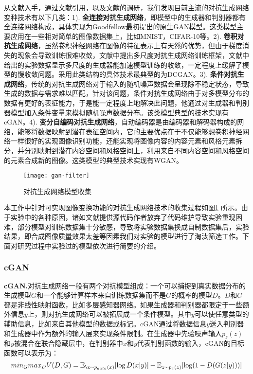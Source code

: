 从文献\cite{UNIT}入手，通过文献引用，以及文献\cite{gan-survey}的调研，我们发现目前主流的对抗生成网络变种技术有以下几类：1). \textbf{全连接对抗生成网络}，即模型中的生成器和判别器都有全连接网络构成，具体实现为Goodfellow最初提出的原生GAN模型。这类模型主要应用在一些相对简单的图像数据集上，比如MNIST，CIFAR-10等。2). \textbf{卷积对抗生成网络}，虽然卷积神经网络在图像的特征表示上有天然的优势，但由于梯度消失的现象会导致训练很难收敛，文献\cite{LAPGAN}中提出多尺度对抗生成网络训练框架，文献中给出的实验数据显示多尺度的生成器能加速模型训练的收敛，一定程度上缓解了模型的慢收敛问题。采用此类结构的具体技术最典型的为DCGAN\cite{dcgan}。3). \textbf{条件对抗生成网络}，传统的对抗生成网络对于输入的随机噪声数据会呈现除不稳定状态，导致生成的数据与需求难以匹配，针对该问题，条件对抗生成网络由于对多模型分布的数据有更好的表征能力，于是能一定程度上地解决此问题，他通过对生成器和判别器模型加入条件变量来模拟随机噪声数据分布。该类模型典型的技术实现有cGAN\cite{cGAN}。4). \textbf{变分自编码对抗生成网络}，自动编码器是由编码器和解码器构成的网络，能够将数据映射到潜在表征空间内，它的主要优点在于不仅能够想卷积神经网络一样很好的实现图像识别功能，还能实现将图像内容的内容元素和风格元素拆分，并分别映射到潜在内容空间和风格空间上，利用来自不同内容空间和风格空间的元素合成新的图像。这类模型的典型技术实现有WGAN\cite{WGAN}。

\begin{figure}[h]
    \centering
    \texttt{[image: gan-filter]}
    \caption{对抗生成网络模型收集}
    \label{gan-filter}
\end{figure}

本工作中针对可实现图像变换功能的对抗生成网络技术的收集过程如图\ref{gan-filter}
所示。由于实验中的各种原因，诸如文献提供源代码作者放弃了代码维护导致实验重现困难，部分模型对训练数据集十分敏感，导致将实验数据集换成自制数据集后，实验结果，即合成图像质量效果太差等因素我们对实验的模型进行了淘汰筛选工作。下面对研究过程中实验过的模型依次进行简要的介绍。

\subsubsection{cGAN}

\textbf{cGAN.}\cite{cGAN}\quad 对抗生成网络一般有两个对抗模型组成：一个可以捕捉到真实数据分布的生成模型$G$和一个能够计算样本来自训练数据集而不是$G$的概率的模型$D$。$D$和$G$都是非线性映射函数，比如多层感知器网络。如果生成器和判别器都限定于一些额外信息$y$上，则对抗生成网络可以被拓展成一个条件模型。其中$y$可以使任意类型的辅助信息，比如来自其他模型的数据或标记。cGAN通过将数据信息$y$送入判别器和生成器中作为额外的输入层来实现条件限制。在生成器中先验噪声输入$p_z(z)$和$y$被混合在联合隐藏层中，在判别器中$x$和$y$代表判别函数的输入，cGAN的目标函数可以表示为：
\begin{gather}
    min_G max_D V(D,G)=\mathbb{E}_{\x\sim p_{data}(x)}[\log D(x|y)]+\mathbb{E}_{z\sim p_z(z)}[\log(1-D(G(z|y)))]
\end{gather}

